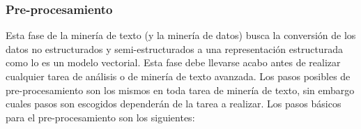   \subsubsection{Pre-procesamiento}
    Esta fase de la minería de texto (y la minería de datos) busca la conversión de los datos no estructurados y semi-estructurados a una representación estructurada como lo es un modelo vectorial. Esta fase debe llevarse acabo antes de realizar cualquier tarea de análisis o de minería de texto avanzada. Los pasos posibles de pre-procesamiento son los mismos en toda tarea de minería de texto, sin embargo cuales pasos son escogidos dependerán de la tarea a realizar.\cite{txtMiningGaryMiner}  %
    Los pasos básicos para el pre-procesamiento son los siguientes:
